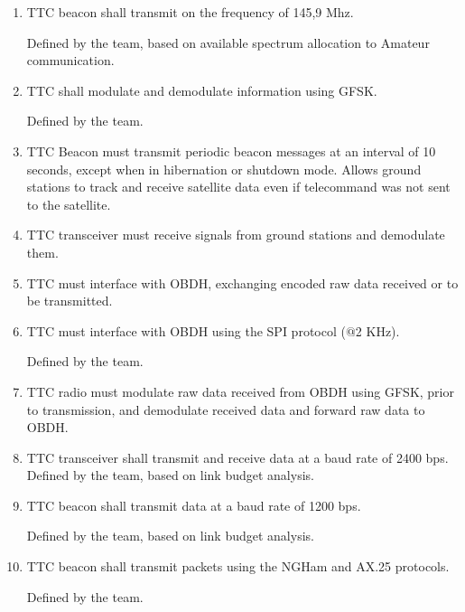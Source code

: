 \documentclass[12pt]{book}
\begin{document}
\begin{enumerate}[label=\textit{TMR \arabic*}, leftmargin=*, align=left]
	\item TTC beacon shall transmit on the frequency of 145,9 Mhz.
	
	\begin{footnotesize}
		Defined by the team, based on available spectrum allocation to Amateur communication.
	\end{footnotesize}
	
	\item TTC shall modulate and demodulate information using GFSK.
	
	\begin{footnotesize}
		Defined by the team.
	\end{footnotesize}
	
	\item TTC Beacon must transmit periodic beacon messages at an interval of 10
seconds, except when in hibernation or shutdown mode. Allows ground stations to track and receive satellite data even if telecommand was not sent to the satellite.
	\item TTC transceiver must receive signals from ground stations and demodulate them.
	\item TTC must interface with OBDH, exchanging encoded raw data received or to be transmitted.
	\item TTC must interface with OBDH using the SPI protocol ($@$2 KHz).
	
	\begin{footnotesize}
		Defined by the team.
	\end{footnotesize}
	
	\item TTC radio must modulate raw data received from OBDH using GFSK, prior to transmission, and demodulate received data and forward raw data to OBDH.
	\item TTC transceiver shall transmit and receive data at a baud rate of 2400 bps. Defined by the team, based on link budget analysis.
	\item TTC beacon shall transmit data at a baud rate of 1200 bps.
	
	\begin{footnotesize}
		Defined by the team, based on link budget analysis.
	\end{footnotesize}
	
	\item TTC beacon shall transmit packets using the NGHam and AX.25 protocols.
	
	\begin{footnotesize}
		Defined by the team.
	\end{footnotesize}
	

\end{enumerate}
\end{document}
